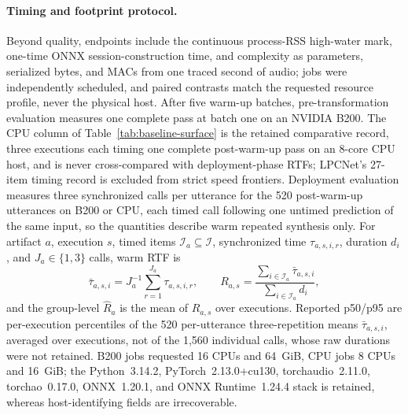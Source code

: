 \paragraph{Timing and footprint protocol.}
Beyond quality, endpoints include the continuous process-RSS high-water
mark, one-time ONNX session-construction time, and complexity as
parameters, serialized bytes, and MACs from one traced second of audio;
jobs were independently
scheduled, and paired contrasts match the requested resource profile,
never the physical host.  After five warm-up batches,
pre-transformation evaluation measures one complete pass at batch one on
an NVIDIA B200.  The CPU column of Table~\ref{tab:baseline-surface} is the
retained comparative record, three executions each timing one complete
post-warm-up pass on an 8-core CPU host, and is never cross-compared with
deployment-phase RTFs; LPCNet's 27-item timing record is excluded from
strict speed frontiers.  Deployment evaluation measures three synchronized
calls per utterance for the 520 post-warm-up utterances on B200 or CPU,
each timed call
following one untimed prediction of the same input, so the quantities
describe warm repeated synthesis only.  For artifact $a$, execution $s$,
timed items $\mathcal I_a\subseteq\mathcal I$, synchronized time
$\tau_{a,s,i,r}$, duration $d_i$, and $J_a\in\{1,3\}$ calls, warm RTF is
\begin{equation}
  \bar\tau_{a,s,i}=J_a^{-1}\sum_{r=1}^{J_a}\tau_{a,s,i,r},\qquad
  R_{a,s}=\frac{\sum_{i\in\mathcal I_a}\bar\tau_{a,s,i}}
                 {\sum_{i\in\mathcal I_a}d_i},
  \label{eq:rtf}
\end{equation}
and the group-level $\widehat R_a$ is the mean of $R_{a,s}$ over
executions.  Reported p50/p95 are per-execution percentiles of the 520
per-utterance three-repetition means $\bar\tau_{a,s,i}$, averaged over
executions, not of the 1,560 individual calls, whose raw durations were
not retained.  B200 jobs requested 16 CPUs and 64~GiB, CPU
jobs 8 CPUs and 16~GiB; the Python~3.14.2, PyTorch~2.13.0+cu130,
torchaudio~2.11.0, torchao~0.17.0, ONNX~1.20.1, and ONNX Runtime~1.24.4 stack
is retained, whereas host-identifying fields are irrecoverable.

